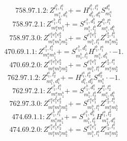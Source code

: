 \documentclass[letterpaper,10pt,fleqn,leqno,onecolumn]{article}
\begin{document}
\begin{equation} \;\;\;\;\;\;  758.97.1.2: Z^{l_{1}^{b},l_{1}^{a}}_{m_{1}^{a},d_{1}^{b}}+=H^{l_{1}^{b},l_{1}^{a}}_{d_{1}^{b},d_{1}^{a}}S^{d_{1}^{a}}_{m_{1}^{a}} \end{equation}
\begin{equation} \;\;\;\;\;\;  758.97.2.1: Z^{e_{1}^{b},l_{1}^{a}}_{m_{1}^{a}m_{1}^{b}}+=S^{e_{1}^{b},d_{1}^{b}}_{m_{1}^{b},l_{1}^{b}}Z^{l_{1}^{b},l_{1}^{a}}_{m_{1}^{a},d_{1}^{b}} \end{equation}
\begin{equation} \;\;\;\;\;\;  758.97.3.0: Z^{e_{1}^{a}e_{1}^{b}e_{2}^{b}}_{m_{1}^{a}m_{1}^{b}m_{2}^{b}}+=S^{e_{1}^{a}e_{1}^{b}}_{m_{1}^{b},l_{1}^{a}}Z^{e_{2}^{b},l_{1}^{a}}_{m_{1}^{a}m_{2}^{b}} \end{equation}
\begin{equation} \;\;\;\;\;\;  470.69.1.1: Z^{e_{1}^{b},l_{1}^{a}}_{m_{1}^{a}m_{1}^{b}}+=S^{e_{1}^{b},d_{1}^{b}}_{m_{1}^{b},l_{1}^{b}}H^{l_{1}^{b},l_{1}^{a}}_{m_{1}^{a},d_{1}^{b}}\cdot -1. \end{equation}
\begin{equation} \;\;\;\;\;\;  470.69.2.0: Z^{e_{1}^{a}e_{1}^{b}e_{2}^{b}}_{m_{1}^{a}m_{1}^{b}m_{2}^{b}}+=S^{e_{1}^{a}e_{1}^{b}}_{m_{1}^{b},l_{1}^{a}}Z^{e_{2}^{b},l_{1}^{a}}_{m_{1}^{a}m_{2}^{b}} \end{equation}
\begin{equation} \;\;\;\;\;\;  762.97.1.2: Z^{l_{1}^{a},l_{2}^{a}}_{m_{1}^{a},d_{1}^{a}}+=H^{l_{1}^{a},l_{2}^{a}}_{d_{1}^{a},d_{2}^{a}}S^{d_{2}^{a}}_{m_{1}^{a}}\cdot -1. \end{equation}
\begin{equation} \;\;\;\;\;\;  762.97.2.1: Z^{e_{1}^{b},l_{1}^{a}}_{m_{1}^{a}m_{1}^{b}}+=S^{e_{1}^{b},d_{1}^{a}}_{m_{1}^{b},l_{2}^{a}}Z^{l_{1}^{a},l_{2}^{a}}_{m_{1}^{a},d_{1}^{a}} \end{equation}
\begin{equation} \;\;\;\;\;\;  762.97.3.0: Z^{e_{1}^{a}e_{1}^{b}e_{2}^{b}}_{m_{1}^{a}m_{1}^{b}m_{2}^{b}}+=S^{e_{1}^{a}e_{1}^{b}}_{m_{1}^{b},l_{1}^{a}}Z^{e_{2}^{b},l_{1}^{a}}_{m_{1}^{a}m_{2}^{b}} \end{equation}
\begin{equation} \;\;\;\;\;\;  474.69.1.1: Z^{e_{1}^{b},l_{1}^{a}}_{m_{1}^{a}m_{1}^{b}}+=S^{e_{1}^{b},d_{1}^{a}}_{m_{1}^{b},l_{2}^{a}}H^{l_{1}^{a},l_{2}^{a}}_{m_{1}^{a},d_{1}^{a}} \end{equation}
\begin{equation} \;\;\;\;\;\;  474.69.2.0: Z^{e_{1}^{a}e_{1}^{b}e_{2}^{b}}_{m_{1}^{a}m_{1}^{b}m_{2}^{b}}+=S^{e_{1}^{a}e_{1}^{b}}_{m_{1}^{b},l_{1}^{a}}Z^{e_{2}^{b},l_{1}^{a}}_{m_{1}^{a}m_{2}^{b}} \end{equation}
\end{document}
